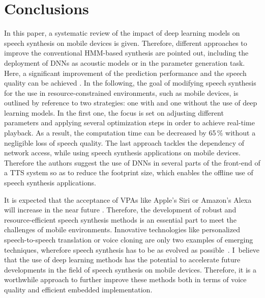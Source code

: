 

\section{Conclusions}
\label{sec:conclusion}

In this paper, a systematic review of the impact of deep learning models on speech synthesis on mobile devices is given. Therefore, different approaches to improve the conventional \ac{HMM}-based synthesis are pointed out, including the deployment of \acp{DNN} as acoustic models or in the parameter generation task. Here, a significant improvement of the prediction performance and the speech quality can be achieved \cite{zen:deepstatistical, hashimoto:effect}. In the following, the goal of modifying speech synthesis for the use in resource-constrained environments, such as mobile devices, is outlined by reference to two strategies: one with and one without the use of deep learning models. In the first one, the focus is set on adjusting different parameters and applying several optimization steps \cite{toth:optimizing} in order to achieve real-time playback. As a result, the computation time can be decreased by 65\,\% without a negligible loss of speech quality. The last approach \cite{boros:robust} tackles the dependency of network access, while using speech synthesis applications on mobile devices. Therefore the authors suggest the use of \acp{DNN} in several parts of the front-end of a \ac{TTS} system so as to reduce the footprint size, which enables the offline use of speech synthesis applications.

It is expected that the acceptance of \acp{VPA} like Apple's Siri or Amazon's Alexa will increase in the near future \cite{gartner:assistants}. Therefore, the development of robust and resource-efficient speech synthesis methods is an essential part to meet the challenges of mobile environments. Innovative technologies like personalized speech-to-speech translation or voice cloning are only two examples of emerging techniques, wherefore speech synthesis has to be as evolved as possible~\cite{edinburgh:speech}. I~believe that the use of deep learning methods has the potential to accelerate future developments in the field of speech synthesis on mobile devices. Therefore, it is a worthwhile approach to further improve these methods both in terms of voice quality and efficient embedded implementation. %